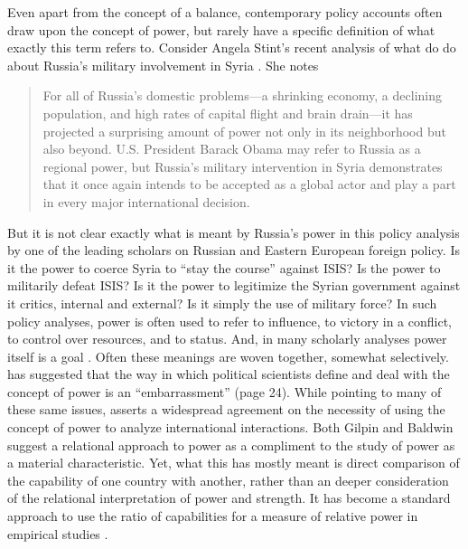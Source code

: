 \documentclass[12pt,oneside,doublespace,pdflatex]{amsart}
\begin{document}
Even apart from the concept of a balance, contemporary policy accounts often draw upon the concept of power, but rarely have a specific definition of what exactly this term refers to. Consider Angela Stint's recent analysis of what do do about Russia's military involvement in Syria 
\cite{stint:2016}. She notes
\begin{quote}
For all of Russia's domestic problems---a shrinking economy, a declining population, and high rates of capital flight and brain drain---it has projected a surprising amount of power not only in its neighborhood but also beyond. U.S. President Barack Obama may refer to Russia as a regional power, but Russia's military intervention in Syria demonstrates that it once again intends to be accepted as a global actor and play a part in every major international decision.
\end{quote}
But it is not clear exactly what is meant by Russia's power in this policy analysis by one of the leading scholars on Russian and Eastern European foreign policy. Is it the power to coerce Syria to ``stay the course'' against ISIS? Is the power to militarily defeat ISIS?  Is it the power to legitimize the Syrian government against it critics, internal and external? Is it simply the use of military force? In such policy analyses, power is often used to refer to influence, to victory in a conflict, to control over resources, and to status.  And, in many scholarly 
analyses power itself is a goal \citep{morgenthau:1948,waltz:1979}.  Often these meanings are woven together, somewhat selectively. 
\citet{gilpin:1975} has suggested that the way in which political scientists define and deal with the concept of power is
an ``embarrassment'' (page 24).  While pointing to many of these same issues, \citet{baldwin:1978} asserts
a widespread agreement on the necessity of using the concept of power to analyze international interactions. Both Gilpin and Baldwin suggest a relational approach to power as a compliment to the study of power as a material characteristic.
Yet, what this has mostly meant is direct comparison of the capability of one country with another, rather than an deeper consideration of the relational interpretation of power and strength.  
It has become a standard approach to use the ratio of capabilities for a measure of relative power in 
empirical studies 
\citep[, among others]{slantchev:2004,reed:etal:2008,butler:gates:2009,gartzke:weisiger:2014,carter:poast:2015}.
\end{document}
